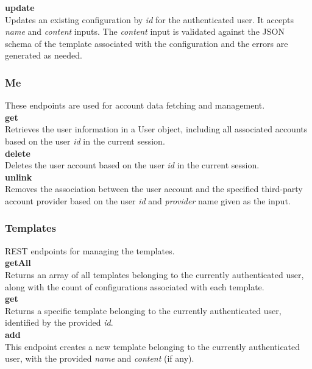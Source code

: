 \noindent
\textbf{update} \\
Updates an existing configuration by \textit{id} for the authenticated user. It accepts \textit{name} and \textit{content} inputs. The \textit{content} input is validated against the JSON schema of the template associated with the configuration and the errors are generated as needed. \\

\subsubsection{Me}

These endpoints are used for account data fetching and management. \\

\noindent
\textbf{get} \\
Retrieves the user information in a User object, including all associated accounts based on the user \textit{id} in the current session. \\

\noindent
\textbf{delete} \\
Deletes the user account based on the user \textit{id} in the current session. \\

\noindent
\textbf{unlink} \\
Removes the association between the user account and the specified third-party account provider based on the user \textit{id} and \textit{provider} name given as the input. \\

\subsubsection{Templates}

REST endpoints for managing the templates. \\

\noindent
\textbf{getAll} \\
Returns an array of all templates belonging to the currently authenticated user, along with the count of configurations associated with each template. \\

\noindent
\textbf{get} \\
Returns a specific template belonging to the currently authenticated user, identified by the provided \textit{id}. \\

\noindent
\textbf{add} \\
This endpoint creates a new template belonging to the currently authenticated user, with the provided \textit{name} and \textit{content} (if any). \\

